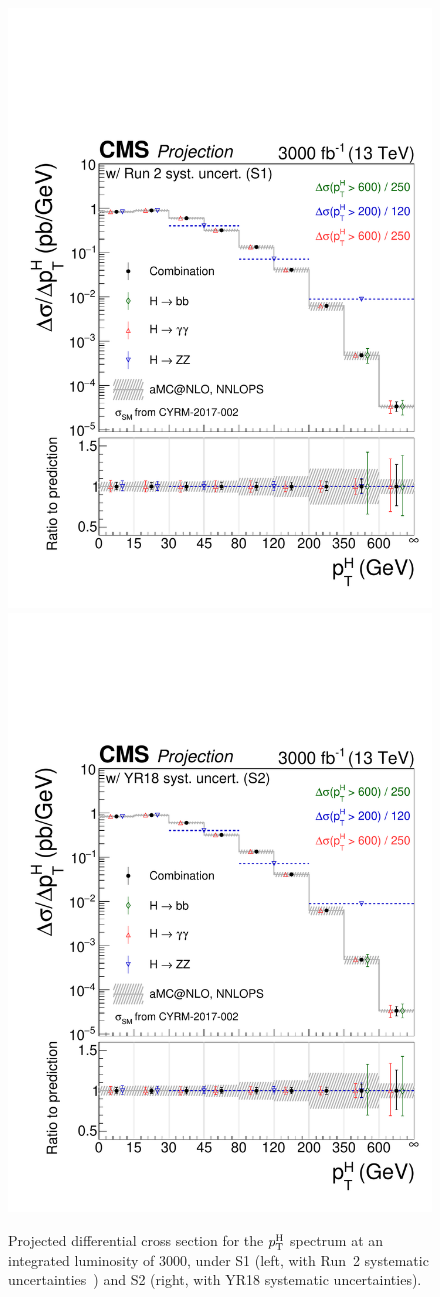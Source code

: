\begin{figure}[hbtp]
  \begin{center}
    \includegraphics[width=0.49\linewidth]{img/projections/projectionspectra_pth_smH.pdf}
    \includegraphics[width=0.49\linewidth]{img/projections/projectionspectra_pth_smH_scenario2.pdf}
    \caption{
        Projected differential cross section for the $p_\mathrm{T}^\mathrm{H}$ spectrum at an integrated luminosity of 3000\fbinv, under S1 (left, with Run~2 systematic uncertainties~\cite{CMS-PAS-HIG-17-028}) and S2 (right, with YR18 systematic uncertainties).
        }
    \label{fig:proj_pth}
  \end{center}
\end{figure}


